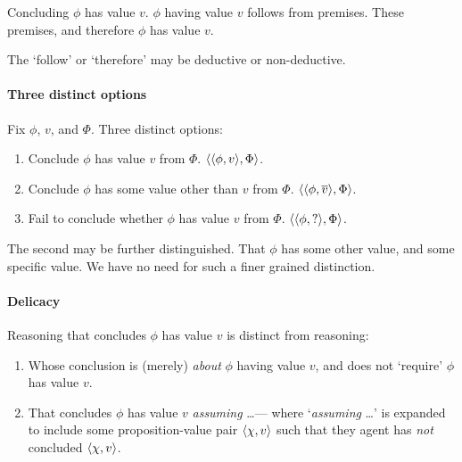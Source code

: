 \begin{note}[Generally]
  Concluding \(\phi\) has value \(v\).
  \(\phi\) having value \(v\) follows from premises.
  These premises, and therefore \(\phi\) has value \(v\).

  The `follow' or `therefore' may be deductive or non-deductive.
\end{note}

\paragraph*{Three distinct options}

\begin{assumption}
  Fix \(\phi\), \(v\), and \(\Phi\).
  Three distinct options:
  \begin{enumerate}
  \item Conclude \(\phi\) has value \(v\) from \(\Phi\).
    \(\langle \langle \phi, v \rangle, \Phi \rangle\).
  \item
    Conclude \(\phi\) has some value other than \(v\) from \(\Phi\).
    \(\langle \langle \phi, \overline{v} \rangle, \Phi \rangle\).
  \item
    Fail to conclude whether \(\phi\) has value \(v\) from \(\Phi\).
    \(\langle \langle \phi, ? \rangle, \Phi \rangle\).
  \end{enumerate}
  The second may be further distinguished.
  That \(\phi\) has some other value, and some specific value.
  We have no need for such a finer grained distinction.
\end{assumption}


\paragraph*{Delicacy}

\begin{note}
  Reasoning that concludes \(\phi\) has value \(v\) is distinct from reasoning:
  \begin{enumerate}[label=\Alph*., ref=(\Alph*)]
  \item
    \label{CS:delicacy:O}
    Whose conclusion is (merely) \emph{about} \(\phi\) having value \(v\), and does not `require' \(\phi\) has value \(v\).
  \item
    \label{CS:delicacy:A}
    That concludes \(\phi\) has value \(v\) \emph{assuming} \dots\space --- where `\emph{assuming} \dots\space' is expanded to include some proposition-value pair \(\langle \chi, v \rangle\) such that they agent has \emph{not} concluded \(\langle \chi, v \rangle\).
  \end{enumerate}
\end{note}


